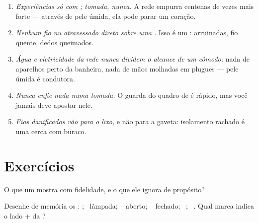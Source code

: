 \begin{remark}\label{rem:g6:circuits-and-safety:rules}
\begin{enumerate}
  \item \emph{Experiências só com ; tomada, nunca.} A rede
        empurra centenas de vezes mais forte --- através de pele
        úmida, ela pode parar um coração.
  \item \emph{Nenhum fio nu atravessado direto sobre uma .} Isso
        é um :  arruinadas, fio quente, dedos
        queimados.
  \item \emph{Água e eletricidade da rede nunca dividem o alcance de
        um cômodo:} nada de aparelhos perto da banheira, nada de mãos
        molhadas em plugues --- pele úmida é condutora.
  \item \emph{Nunca enfie nada numa tomada.} O guarda do quadro de
         é rápido, mas você jamais deve apostar nele.
  \item \emph{Fios danificados vão para o lixo,} e não para a gaveta:
        isolamento rachado é uma cerca com buraco.
\end{enumerate}
\end{remark}

\section{Exercícios}

\begin{exercise}[$\star$]\label{exo:g6:circuits-and-safety:1}
O que um  mostra com fidelidade, e o que ele ignora
de propósito?
\end{exercise}

\begin{exercise}[$\star$]\label{exo:g6:circuits-and-safety:2}
Desenhe de memória os : ; \ lâmpada; \ 
aberto; \  fechado; \ ; \ . Qual marca
indica o lado $+$ da ?
\end{exercise}

